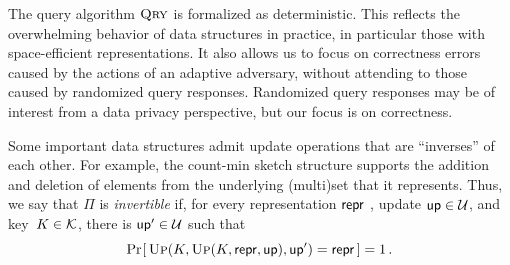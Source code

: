 The query algorithm $\textnormal{\textsc{Qry}}$ is formalized as deterministic.  This reflects the
overwhelming behavior of data structures in practice, in particular those with
space-efficient representations.  It also allows us to focus on correctness
errors caused by the actions of an adaptive adversary, without attending to
those caused by randomized query responses.  Randomized query responses may be
of interest from a data privacy perspective, but our focus is on correctness.

%
Some important data structures admit update operations that are ``inverses'' of
each other.  For example, the count-min sketch structure supports the addition
and deletion of elements from the underlying (multi)set that it represents.
Thus, we say that $\Pi$ is {\em invertible} if, for every representation $\mathsf{repr}$
, update $\mathsf{up} \in \mathcal{U}$, and key~$K \in \mathcal{K}$, there is $\mathsf{up}' \in
\mathcal{U}$ such that \[\Pr\hspace{-1pt}\left[\,\textnormal{\textsc{Up}}(K,\textnormal{\textsc{Up}}(K,\mathsf{repr},\mathsf{up}),\mathsf{up}') = \mathsf{repr}\,\right] = 1\,.\]



